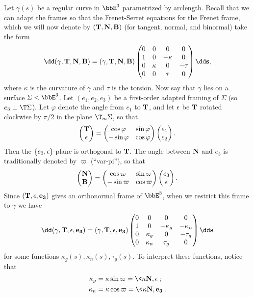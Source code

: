 Let $\gamma(s)$ be a regular curve in $\bbE^3$ parametrized by arclength. Recall that we can adapt the frames so that the Frenet-Serret equations for the Frenet frame, which we will now denote by $(\bf{T},\bf{N},\bf{B})$ (for tangent, normal, and binormal) take the form
\[\dd(\gamma,\bf{T},\bf{N},\bf{B})=(\gamma,\bf{T},\bf{N},\bf{B})\begin{pmatrix}
    0 & 0&0&0\\
    1&0&-\kappa &0\\
    0& \kappa &0 &-\tau \\
    0 & 0& \tau & 0
\end{pmatrix}\dd s,\]
where $\kappa$ is the curvature of $\gamma$ and $\tau$ is the torsion. Now say that $\gamma$ lies on a surface $\Sigma <\bbE^3$. Let $(e_1,e_2,e_3)$ be a first-order adapted framing of $\Sigma$ (so $e_3\perp \T\Sigma$). Let $\varphi$ denote the angle from $e_1$ to $\bf{T}$, and let $\bf{\epsilon}$ be $\bf{T}$ rotated clockwise by $\pi/2$ in the plane $\T_m\Sigma$, so that 
\[\begin{pmatrix}
    \bf{T}\\\bf{\epsilon}
\end{pmatrix}=\begin{pmatrix}
    \cos\varphi & \sin\varphi\\
    -\sin\varphi & \cos\varphi
\end{pmatrix}\begin{pmatrix}
    e_1\\ e_2
\end{pmatrix}.\]
Then the $\{e_3,\bf{\epsilon}\}$-plane is orthogonal to $\bf{T}$. The angle between $\bf{N}$ and $e_3$ is traditionally denoted by $\varpi$ (``var-pi''), so that 
\[\begin{pmatrix}
    \bf{N}\\\bf{B}
\end{pmatrix}=\begin{pmatrix}
    \cos\varpi & \sin\varpi\\
    -\sin\varpi & \cos\varpi
\end{pmatrix}\begin{pmatrix}
    e_3\\ \bf{\epsilon}
\end{pmatrix}.\]
Since $(\bf{T},\bf{\epsilon},e_3)$ gives an orthonormal frame of $\bbE^3$, when we restrict this frame to $\gamma$ we have 
\[\dd (\gamma,\bf{T},\bf{\epsilon},e_3)=(\gamma,\bf{T},\bf{\epsilon},e_3)\begin{pmatrix}
    0&0&0&0\\
    1&0&-\kappa_g &-\kappa_n\\
    0&\kappa_g&0&-\tau_g\\
    0&\kappa_n&\tau_g&0
\end{pmatrix}\dd s\]
for some functions $\kappa_g(s),\kappa_n(s),\tau_g(s)$. To interpret these functions, notice that 
\begin{align}
    \kappa_g&=\kappa\sin\varpi=\<\kappa \bf{N},\bf{\epsilon}\>;\\
    \kappa_n&=\kappa\cos\varpi=\<\kappa \bf{N},e_3\>.\\
\end{align}

